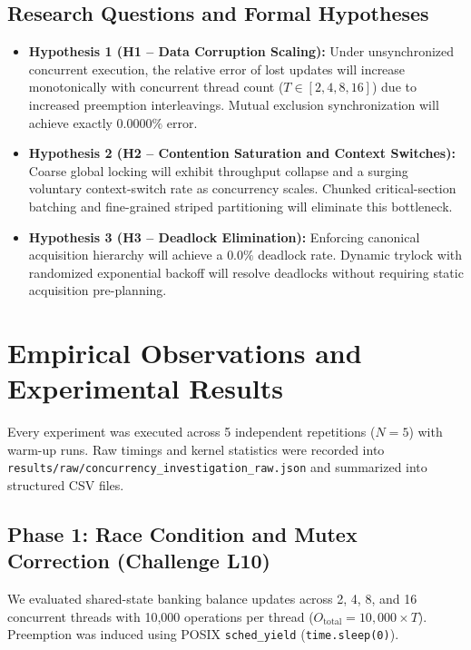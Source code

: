 \documentclass[11pt,a4paper]{article}
\begin{document}
\subsection{Research Questions and Formal Hypotheses}
\begin{itemize}
    \item \textbf{Hypothesis 1 (H1 -- Data Corruption Scaling):} Under unsynchronized concurrent execution, the relative error of lost updates will increase monotonically with concurrent thread count ($T \in [2, 4, 8, 16]$) due to increased preemption interleavings. Mutual exclusion synchronization will achieve exactly $0.0000\%$ error.
    \item \textbf{Hypothesis 2 (H2 -- Contention Saturation and Context Switches):} Coarse global locking will exhibit throughput collapse and a surging voluntary context-switch rate as concurrency scales. Chunked critical-section batching and fine-grained striped partitioning will eliminate this bottleneck.
    \item \textbf{Hypothesis 3 (H3 -- Deadlock Elimination):} Enforcing canonical acquisition hierarchy will achieve a $0.0\%$ deadlock rate. Dynamic trylock with randomized exponential backoff will resolve deadlocks without requiring static acquisition pre-planning.
\end{itemize}

\section{Empirical Observations and Experimental Results}

Every experiment was executed across 5 independent repetitions ($N=5$) with warm-up runs. Raw timings and kernel statistics were recorded into \texttt{results/raw/concurrency\_investigation\_raw.json} and summarized into structured CSV files.

\subsection{Phase 1: Race Condition and Mutex Correction (Challenge L10)}
We evaluated shared-state banking balance updates across 2, 4, 8, and 16 concurrent threads with 10,000 operations per thread ($O_{\text{total}} = 10,000 \times T$). Preemption was induced using POSIX \texttt{sched\_yield} (\texttt{time.sleep(0)}).
\end{document}
